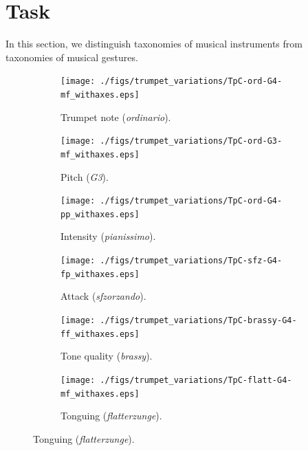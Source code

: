 \documentclass{article}
\begin{document}
\section{Task}
In this section, we distinguish taxonomies of musical instruments from taxonomies of musical gestures.


\begin{figure}
        \begin{subfigure}[b]{0.25\textwidth}
                \centering
                \texttt{[image: ./figs/trumpet\_variations/TpC-ord-G4-mf\_withaxes.eps]}
                \caption{Trumpet note (\emph{ordinario}).}
                \label{fig:TpC-ord-G4-mf_withaxes}
        \end{subfigure}%
        \begin{subfigure}[b]{0.25\textwidth}
                \centering
                \texttt{[image: ./figs/trumpet\_variations/TpC-ord-G3-mf\_withaxes.eps]}
                \caption{Pitch (\emph{G3}).}
                \label{fig:TpC-ord-G3-mf_withaxes}
        \end{subfigure}%
        
        \begin{subfigure}[b]{0.25\textwidth}
                \centering
                \texttt{[image: ./figs/trumpet\_variations/TpC-ord-G4-pp\_withaxes.eps]}
                \caption{Intensity (\emph{pianissimo}).}
                \label{fig:TpC-ord-G4-pp_withaxes}
        \end{subfigure}%
        \begin{subfigure}[b]{0.25\textwidth}
                \centering
                \texttt{[image: ./figs/trumpet\_variations/TpC-sfz-G4-fp\_withaxes.eps]}
                \caption{Attack (\emph{sfzorzando}).}
                \label{fig:TpC-sfz-G4-fp_withaxes}
        \end{subfigure}
        
        \begin{subfigure}[b]{0.25\textwidth}
                \centering
                \texttt{[image: ./figs/trumpet\_variations/TpC-brassy-G4-ff\_withaxes.eps]}
                \caption{Tone quality (\emph{brassy}).}
                \label{fig:TpC-brassy-G4-mf_withaxes}
        \end{subfigure}%
        \begin{subfigure}[b]{0.25\textwidth}
                \centering
                \texttt{[image: ./figs/trumpet\_variations/TpC-flatt-G4-mf\_withaxes.eps]}
                \caption{Tonguing (\emph{flatterzunge}).}
                \label{fig:TpC-flatt-G4-mf_withaxes}
        \end{subfigure}
        

\end{figure}
\end{document}
